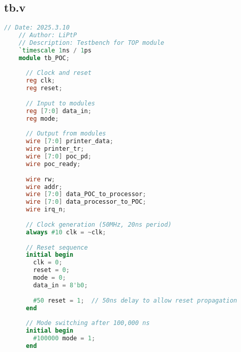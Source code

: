 \documentclass[lang=cn,a4paper,newtx]{elegantpaper}
\begin{document}
\subsection{tb.v}\label{sec:tb}
\begin{lstlisting}[language=verilog]
    // Date: 2025.3.10
    // Author: LiPtP
    // Description: Testbench for TOP module
    `timescale 1ns / 1ps
    module tb_POC;
    
      // Clock and reset
      reg clk;
      reg reset;
    
      // Input to modules
      reg [7:0] data_in;
      reg mode;
    
      // Output from modules
      wire [7:0] printer_data;
      wire printer_tr;
      wire [7:0] poc_pd;
      wire poc_ready;
    
      wire rw;
      wire addr;
      wire [7:0] data_POC_to_processor;
      wire [7:0] data_processor_to_POC;
      wire irq_n;
    
      // Clock generation (50MHz, 20ns period)
      always #10 clk = ~clk;
    
      // Reset sequence
      initial begin
        clk = 0;
        reset = 0;
        mode = 0;
        data_in = 8'b0;
    
        #50 reset = 1;  // 50ns delay to allow reset propagation
      end
    
      // Mode switching after 100,000 ns
      initial begin
        #100000 mode = 1;
      end
    

\end{lstlisting}
\end{document}
